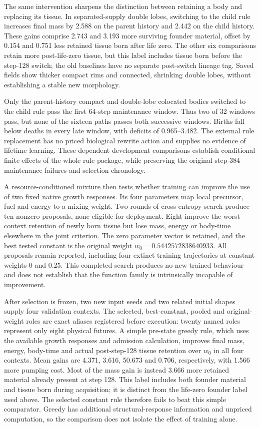 The same intervention sharpens the distinction between retaining a body and replacing its tissue. In separated-supply double lobes, switching to the child rule increases final mass by 2.588 on the parent history and 2.442 on the child history. These gains comprise 2.743 and 3.193 more surviving founder material, offset by 0.154 and 0.751 less retained tissue born after life zero. The other six comparisons retain more post-life-zero tissue, but this label includes tissue born before the step-128 switch; the old baselines have no separate post-switch lineage tag. Saved fields show thicker compact rims and connected, shrinking double lobes, without establishing a stable new morphology.

Only the parent-history compact and double-lobe colocated bodies switched to the child rule pass the first 64-step maintenance window. Thus two of 32 windows pass, but none of the sixteen paths passes both successive windows. Births fall below deaths in every late window, with deficits of 0.965--3.482. The external rule replacement has no priced biological rewrite action and supplies no evidence of lifetime learning. These dependent development comparisons establish conditional finite effects of the whole rule package, while preserving the original step-384 maintenance failures and selection chronology.

A resource-conditioned mixture then tests whether training can improve the use of two fixed native growth responses. Its four parameters map local precursor, fuel and energy to a mixing weight. Two rounds of cross-entropy search produce ten nonzero proposals, none eligible for deployment. Eight improve the worst-context retention of newly born tissue but lose mass, energy or body-time elsewhere in the joint criterion. The zero parameter vector is retained, and the best tested constant is the original weight $w_0=0.5442572838640933$. All proposals remain reported, including four extinct training trajectories at constant weights 0 and 0.25. This completed search produces no new trained behaviour and does not establish that the function family is intrinsically incapable of improvement.

After selection is frozen, two new input seeds and two related initial shapes supply four validation contexts. The selected, best-constant, pooled and original-weight roles are exact aliases registered before execution: twenty named roles represent only eight physical futures. A simple pre-state greedy rule, which uses the available growth responses and admission calculation, improves final mass, energy, body-time and actual post-step-128 tissue retention over $w_0$ in all four contexts. Mean gains are 4.371, 3.616, 50.673 and 0.706, respectively, with 1.566 more pumping cost. Most of the mass gain is instead 3.666 more retained material already present at step 128. This label includes both founder material and tissue born during acquisition; it is distinct from the life-zero founder label used above. The selected constant rule therefore fails to beat this simple comparator. Greedy has additional structural-response information and unpriced computation, so the comparison does not isolate the effect of training alone.

